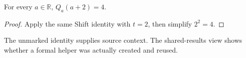 \begin{theorem}\label{thm:demo-shift-two}
For every $a\in\mathbb{R}$, $Q_a(a+2)=4$.
\end{theorem}
\begin{proof}
Apply the same Shift identity with $t=2$, then simplify $2^2=4$.
\end{proof}

\vfill
{\small\color{leagreen}The unmarked identity supplies source context.
The shared-results view shows whether a formal helper was actually created
and reused.}
